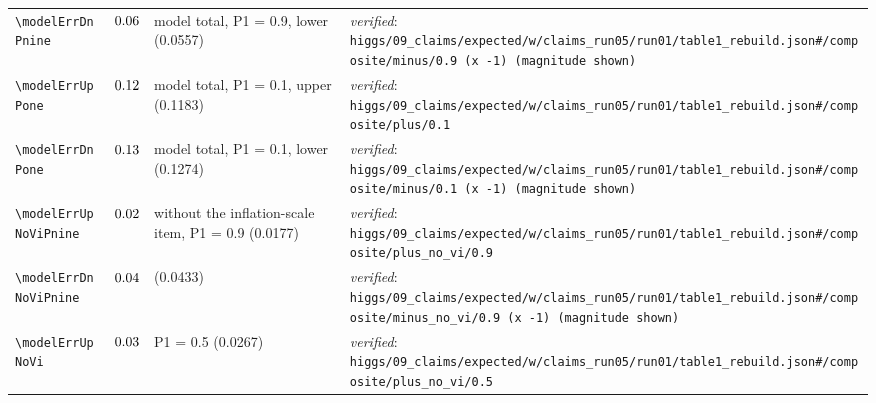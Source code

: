 {\begin{longtable}{@{}>{\raggedright\arraybackslash}p{}>{\raggedright\arraybackslash}p{}>{\raggedright\arraybackslash}p{}>{\raggedright\arraybackslash}p{}@{}}
\texttt{\textbackslash modelErrDnPnine} & $0.06$ & model total, P1 = 0.9, lower (0.0557) & \emph{verified}: \texttt{higgs/\allowbreak{}09\_\allowbreak{}claims/\allowbreak{}expected/\allowbreak{}w/\allowbreak{}claims\_\allowbreak{}run05/\allowbreak{}run01/\allowbreak{}table1\_\allowbreak{}rebuild.json\#/\allowbreak{}composite/\allowbreak{}minus/\allowbreak{}0.9 (x -1) (magnitude shown)} \\
\texttt{\textbackslash modelErrUpPone} & $0.12$ & model total, P1 = 0.1, upper (0.1183) & \emph{verified}: \texttt{higgs/\allowbreak{}09\_\allowbreak{}claims/\allowbreak{}expected/\allowbreak{}w/\allowbreak{}claims\_\allowbreak{}run05/\allowbreak{}run01/\allowbreak{}table1\_\allowbreak{}rebuild.json\#/\allowbreak{}composite/\allowbreak{}plus/\allowbreak{}0.1} \\
\texttt{\textbackslash modelErrDnPone} & $0.13$ & model total, P1 = 0.1, lower (0.1274) & \emph{verified}: \texttt{higgs/\allowbreak{}09\_\allowbreak{}claims/\allowbreak{}expected/\allowbreak{}w/\allowbreak{}claims\_\allowbreak{}run05/\allowbreak{}run01/\allowbreak{}table1\_\allowbreak{}rebuild.json\#/\allowbreak{}composite/\allowbreak{}minus/\allowbreak{}0.1 (x -1) (magnitude shown)} \\
\texttt{\textbackslash modelErrUpNoViPnine} & $0.02$ & without the inflation-scale item, P1 = 0.9 (0.0177) & \emph{verified}: \texttt{higgs/\allowbreak{}09\_\allowbreak{}claims/\allowbreak{}expected/\allowbreak{}w/\allowbreak{}claims\_\allowbreak{}run05/\allowbreak{}run01/\allowbreak{}table1\_\allowbreak{}rebuild.json\#/\allowbreak{}composite/\allowbreak{}plus\_\allowbreak{}no\_\allowbreak{}vi/\allowbreak{}0.9} \\
\texttt{\textbackslash modelErrDnNoViPnine} & $0.04$ & (0.0433) & \emph{verified}: \texttt{higgs/\allowbreak{}09\_\allowbreak{}claims/\allowbreak{}expected/\allowbreak{}w/\allowbreak{}claims\_\allowbreak{}run05/\allowbreak{}run01/\allowbreak{}table1\_\allowbreak{}rebuild.json\#/\allowbreak{}composite/\allowbreak{}minus\_\allowbreak{}no\_\allowbreak{}vi/\allowbreak{}0.9 (x -1) (magnitude shown)} \\
\texttt{\textbackslash modelErrUpNoVi} & $0.03$ & P1 = 0.5 (0.0267) & \emph{verified}: \texttt{higgs/\allowbreak{}09\_\allowbreak{}claims/\allowbreak{}expected/\allowbreak{}w/\allowbreak{}claims\_\allowbreak{}run05/\allowbreak{}run01/\allowbreak{}table1\_\allowbreak{}rebuild.json\#/\allowbreak{}composite/\allowbreak{}plus\_\allowbreak{}no\_\allowbreak{}vi/\allowbreak{}0.5} \\

\end{longtable}}
